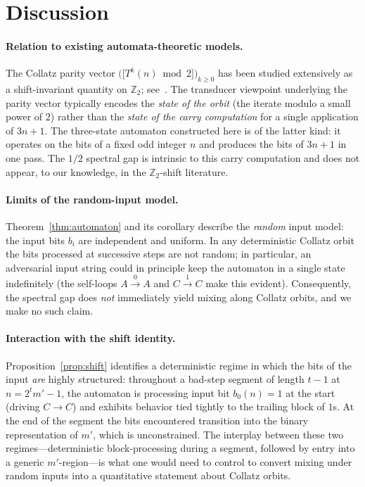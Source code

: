 \documentclass[11pt,a4paper]{article}
\theoremstyle{definition}
\theoremstyle{remark}
\newcommand{\Z}{\mathbb{Z}}
\begin{document}
\section{Discussion}\label{sec:disc}

\paragraph{Relation to existing automata-theoretic models.}
The Collatz parity vector
$\bigl(\bigl[T^k(n) \bmod 2\bigr]\bigr)_{k \geq 0}$ has been studied
extensively as a shift-invariant quantity on $\Z_2$;
see~\cite{Lagarias1985,BernsteinLagarias1996}.  The transducer
viewpoint underlying the parity vector typically encodes the
\emph{state of the orbit} (the iterate modulo a small power of $2$)
rather than the \emph{state of the carry computation} for a single
application of $3n + 1$.  The three-state automaton constructed here is
of the latter kind: it operates on the bits of a fixed odd integer
$n$ and produces the bits of $3n + 1$ in one pass.  The $1/2$ spectral
gap is intrinsic to this carry computation and does not appear, to our
knowledge, in the $\Z_2$-shift literature.

\paragraph{Limits of the random-input model.}
Theorem~\ref{thm:automaton} and its corollary describe the \emph{random}
input model: the input bits $b_i$ are independent and uniform.  In any
deterministic Collatz orbit the bits processed at successive steps are
not random; in particular, an adversarial input string could in principle
keep the automaton in a single state indefinitely (the self-loops
$A \xrightarrow{0} A$ and $C \xrightarrow{1} C$ make this evident).
Consequently, the spectral gap does \emph{not} immediately yield mixing
along Collatz orbits, and we make no such claim.

\paragraph{Interaction with the shift identity.}
Proposition~\ref{prop:shift} identifies a deterministic regime in which
the bits of the input \emph{are} highly structured: throughout a
bad-step segment of length $t-1$ at $n = 2^t m' - 1$, the automaton is
processing input bit $b_0(n) = 1$ at the start (driving $C \to C$) and
exhibits behavior tied tightly to the trailing block of $1$s.  At the
end of the segment the bits encountered transition into the binary
representation of $m'$, which is unconstrained.  The interplay between
these two regimes---deterministic block-processing during a segment,
followed by entry into a generic $m'$-region---is what one would need to
control to convert mixing under random inputs into a quantitative
statement about Collatz orbits.
\end{document}

